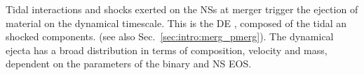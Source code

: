Tidal interactions and shocks exerted on the \acp{NS} at merger trigger the ejection of material
on the dynamical timescale. This is the \ac{DE} \citep[\eg][]{Hotokezaka:2013b,Bauswein:2013yna,Radice:2016dwd,Radice:2018pdn},
composed of the tidal an shocked components.
(see also Sec.~\ref{sec:intro:merg_pmerg}).
%
%
%
The dynamical ejecta has a broad distribution in terms of composition, 
velocity and mass, dependent on the parameters of the binary and \ac{NS} \ac{EOS}.

